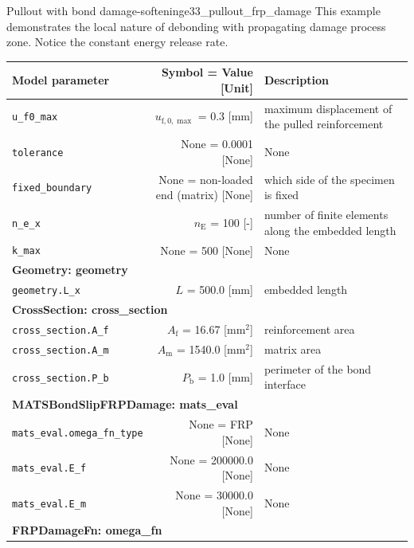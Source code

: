 \documentclass[main.tex]{subfiles}
\begin{document}
\begin{bmcsex}{Pullout with bond damage-softening}{e33_pullout_frp_damage}
\noindent This example demonstrates the local nature of debonding
    with propagating damage process zone. Notice the constant 
    energy release rate.
 \\
\begin{center}
            
{\scriptsize 
\begin{longtable}{lrp{4cm}}\toprule
\textbf{\textsf{Model parameter}} 
& 
\textbf{\textsf{Symbol = Value [Unit]}} 
&
\textbf{\textsf{Description}}  \\\midrule \midrule
\texttt{u\_f0\_max} & $u_{\mathrm{f},0,{\max}}$ = 0.3 [mm] & {\footnotesize maximum displacement of the pulled reinforcement}  \\
            \texttt{tolerance} & None = 0.0001 [None] & {\footnotesize None}  \\
            \texttt{fixed\_boundary} & None = non-loaded end (matrix) [None] & {\footnotesize which side of the specimen is fixed}  \\
            \texttt{n\_e\_x} & $n_\mathrm{E}$ = 100 [-] & {\footnotesize number of finite elements along the embedded length}  \\
            \texttt{k\_max} & None = 500 [None] & {\footnotesize None}  \\
            \midrule
\multicolumn{3}{l}{\textbf{\textsf{Geometry: geometry}}}\\

\texttt{geometry.L\_x} & $L$ = 500.0 [$\mathrm{mm}$] & {\footnotesize embedded length}  \\
            \midrule
\multicolumn{3}{l}{\textbf{\textsf{CrossSection: cross\_section}}}\\

\texttt{cross\_section.A\_f} & $A_\mathrm{f}$ = 16.67 [$\mathrm{mm}^2$] & {\footnotesize reinforcement area}  \\
            \texttt{cross\_section.A\_m} & $A_\mathrm{m}$ = 1540.0 [$\mathrm{mm}^2$] & {\footnotesize matrix area}  \\
            \texttt{cross\_section.P\_b} & $P_\mathrm{b}$ = 1.0 [$\mathrm{mm}$] & {\footnotesize perimeter of the bond interface}  \\
            \midrule
\multicolumn{3}{l}{\textbf{\textsf{MATSBondSlipFRPDamage: mats\_eval}}}\\

\texttt{mats\_eval.omega\_fn\_type} & None = FRP [None] & {\footnotesize None}  \\
            \texttt{mats\_eval.E\_f} & None = 200000.0 [None] & {\footnotesize None}  \\
            \texttt{mats\_eval.E\_m} & None = 30000.0 [None] & {\footnotesize None}  \\
            \midrule
\multicolumn{3}{l}{\textbf{\textsf{FRPDamageFn: omega\_fn}}}\\


\end{longtable}}
\end{center}
\end{bmcsex}
\end{document}
